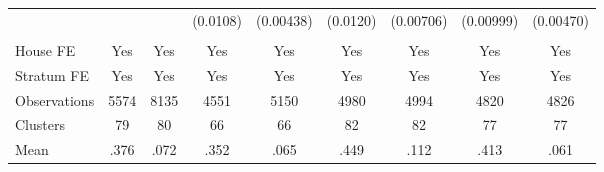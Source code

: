 {\begin{tabular}{l*{8}{c}}
                &         &         & (0.0108)&(0.00438)& (0.0120)&(0.00706)&(0.00999)&(0.00470)\\
                &         &         &         &         &         &         &         &         \\
House FE        &      Yes&      Yes&      Yes&      Yes&      Yes&      Yes&      Yes&      Yes\\
Stratum FE      &      Yes&      Yes&      Yes&      Yes&      Yes&      Yes&      Yes&      Yes\\
\midrule
Observations    &     5574&     8135&     4551&     5150&     4980&     4994&     4820&     4826\\
Clusters        &       79&       80&       66&       66&       82&       82&       77&       77\\
Mean            &     .376&     .072&     .352&     .065&     .449&     .112&     .413&     .061\\
\bottomrule
\end{tabular}
}
